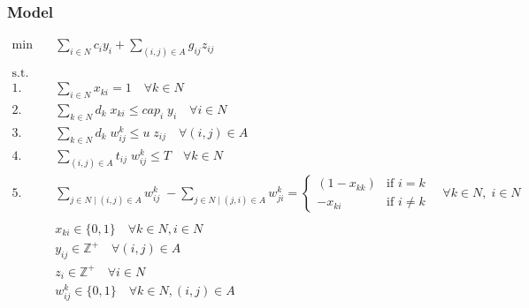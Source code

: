 \subsubsection*{Model}

\begin{align*}
    \min \quad & \sum_{i \in N} c_i y_i + \sum_{(i, j) \in A} g_{ij} z_{ij} & \\
	\\
    \text{s.t.} \quad &  \\
	1. \quad & \sum_{i \in N} x_{ki} = 1 \quad \forall k \in N  \\
	2. \quad & \sum_{k \in N} d_k \; x_{ki} \le cap_i \; y_i \quad \forall i \in N  \\
	3. \quad & \sum_{k \in N} d_k \; w_{ij}^k \le u \; z_{ij} \quad \forall (i, j) \in A \quad  \\
	4. \quad & \sum_{(i, j) \in A} t_{ij} \; w_{ij}^k \le T \quad \forall k \in N  \\
	5. \quad & \sum_{j \in N \mid (i, j) \in A} w_{ij}^k \; - \sum_{j \in N \mid (j, i) \in A} w_{ji}^k = \left\{
	\begin{array}{rl}
		(1 - x_{kk}) & \text{if } i = k  \\
		-x_{ki} & \text{if } i \ne k
	\end{array}
	\right.
	\quad \forall k \in N, \; i \in N  \\
	\\
	& x_{ki} \in \{0, 1\} \quad \forall k \in N, i \in N  \\
	& y_{ij} \in \mathbb{Z}^+ \quad \forall (i, j) \in A  \\
	& z_i \in \mathbb{Z}^+ \quad \forall i \in N  \\
	& w_{ij}^k \in \{0, 1\} \quad \forall k \in N, (i, j) \in A  \\
\end{align*}
